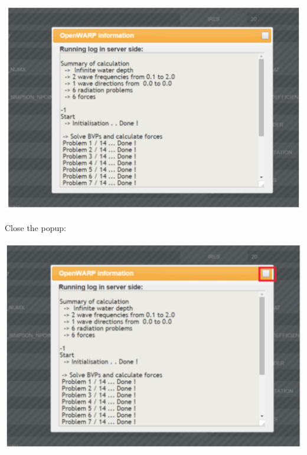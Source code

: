 \documentclass[12pt]{article}
\begin{document}
\vspace{\abovedisplayskip}
\begin{minipage}{\linewidth}
	\centering
	\includegraphics[scale=0.5]{img/50}
\end{minipage}
\vspace{\belowdisplayskip}

Close the popup:

\vspace{\abovedisplayskip}
\begin{minipage}{\linewidth}
	\centering
	\includegraphics[scale=0.5]{img/51}
\end{minipage}
\vspace{\belowdisplayskip}
\end{document}
